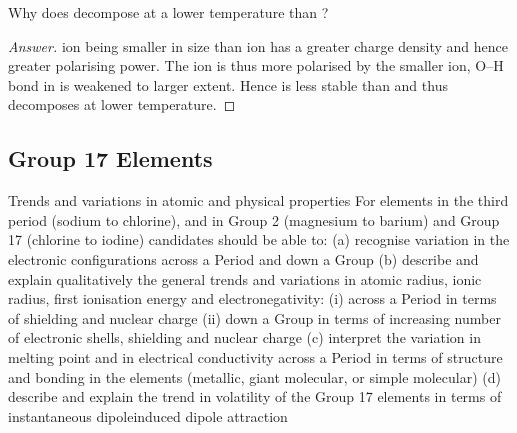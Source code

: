 \begin{exercise}{}{}
Why does  decompose at a lower temperature than ?\end{exercise}
\begin{proof}[Answer]
 ion being smaller in size than  ion has a greater charge density and hence greater polarising power. The  ion is thus more polarised by the smaller  ion, O--H bond in  is weakened to larger extent. Hence  is less stable than  and thus decomposes at lower temperature.
\end{proof}
\pagebreak

\subsection{Group 17 Elements}
Trends and variations in atomic and physical properties
For elements in the third period (sodium to chlorine), and in Group 2 (magnesium to barium) and Group 17
(chlorine to iodine) candidates should be able to:
(a) recognise variation in the electronic configurations across a Period and down a Group
(b) describe and explain qualitatively the general trends and variations in atomic radius, ionic radius, first
ionisation energy and electronegativity:
(i) across a Period in terms of shielding and nuclear charge
(ii) down a Group in terms of increasing number of electronic shells, shielding and nuclear charge
(c) interpret the variation in melting point and in electrical conductivity across a Period in terms of structure and
bonding in the elements (metallic, giant molecular, or simple molecular)
(d) describe and explain the trend in volatility of the Group 17 elements in terms of instantaneous dipoleinduced dipole attraction 
\pagebreak

